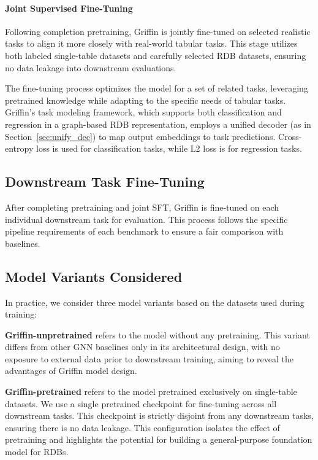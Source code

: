 \documentclass{article}
\theoremstyle{plain}
\theoremstyle{definition}
\theoremstyle{remark}
\begin{document}
\vspace*{-0.25cm}
\paragraph{Joint Supervised Fine-Tuning}
Following completion pretraining, Griffin is jointly fine-tuned on selected realistic tasks to align it more closely with real-world tabular tasks. This stage utilizes both labeled single-table datasets and carefully selected RDB datasets, ensuring no data leakage into downstream evaluations.

The fine-tuning process optimizes the model for a set of related tasks, leveraging pretrained knowledge while adapting to the specific needs of tabular tasks. Griffin's task modeling framework, which supports both classification and regression in a graph-based RDB representation, employs a unified decoder (as in Section~\ref{sec:unify_dec}) to map output embeddings to task predictions. Cross-entropy loss is used for classification tasks, while L2 loss is for regression tasks.

\vspace*{-0.1cm}
\subsection{Downstream Task Fine-Tuning}
After completing pretraining and joint SFT, Griffin is fine-tuned on each individual downstream task for evaluation. This process follows the specific pipeline requirements of each benchmark to ensure a fair comparison with baselines.

\vspace*{-0.1cm}
\subsection{Model Variants Considered}

In practice, we consider three model variants based on the datasets used during training:

\textbf{Griffin-unpretrained} refers to the model without any pretraining. This variant differs from other GNN baselines only in its architectural design, with no exposure to external data prior to downstream training, aiming to reveal the advantages of Griffin model design.

\textbf{Griffin-pretrained} refers to the model pretrained exclusively on single-table datasets. We use a single pretrained checkpoint for fine-tuning across all downstream tasks. This checkpoint is strictly disjoint from any downstream tasks, ensuring there is no data leakage. This configuration isolates the effect of pretraining and highlights the potential for building a general-purpose foundation model for RDBs.
\end{document}

